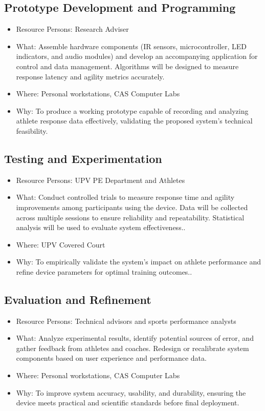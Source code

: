 \subsection{Prototype Development and Programming}
\begin{itemize}
	\item Resource Persons: Research Adviser
	\item What: Assemble hardware components (IR sensors, microcontroller, LED indicators, and audio modules) and develop an accompanying application for control and data management. Algorithms will be designed to measure response latency and agility metrics accurately.
	\item Where: Personal workstations, CAS Computer Labs
	\item Why: To produce a working prototype capable of recording and analyzing athlete response data effectively, validating the proposed system’s technical feasibility.
\end{itemize}


\subsection{Testing and Experimentation}
\begin{itemize}
	\item Resource Persons: UPV PE Department and Athletes
	\item What: Conduct controlled trials to measure response time and agility improvements among participants using the device. Data will be collected across multiple sessions to ensure reliability and repeatability. Statistical analysis will be used to evaluate system effectiveness..
	\item Where: UPV Covered Court
	\item Why: To empirically validate the system’s impact on athlete performance and refine device parameters for optimal training outcomes..
\end{itemize}

\subsection{Evaluation and Refinement}
\begin{itemize}
	\item Resource Persons: Technical advisors and sports performance analysts
	\item What: Analyze experimental results, identify potential sources of error, and gather feedback from athletes and coaches. Redesign or recalibrate system components based on user experience and performance data.
	\item Where: Personal workstations, CAS Computer Labs
	\item Why: To improve system accuracy, usability, and durability, ensuring the device meets practical and scientific standards before final deployment.
\end{itemize}

